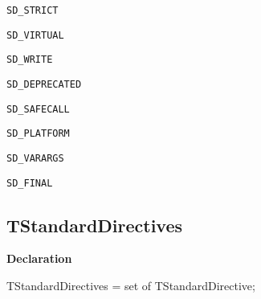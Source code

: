 \documentclass{report}
\newif\ifpdf
\begin{document}
\begin{list}{}
\begin{description}
\item[\texttt{SD{\_}STRICT}] \label{PasDoc_Tokenizer-SD_STRICT}
\index{}
 
\item[\texttt{SD{\_}VIRTUAL}] \label{PasDoc_Tokenizer-SD_VIRTUAL}
\index{}
 
\item[\texttt{SD{\_}WRITE}] \label{PasDoc_Tokenizer-SD_WRITE}
\index{}
 
\item[\texttt{SD{\_}DEPRECATED}] \label{PasDoc_Tokenizer-SD_DEPRECATED}
\index{}
 
\item[\texttt{SD{\_}SAFECALL}] \label{PasDoc_Tokenizer-SD_SAFECALL}
\index{}
 
\item[\texttt{SD{\_}PLATFORM}] \label{PasDoc_Tokenizer-SD_PLATFORM}
\index{}
 
\item[\texttt{SD{\_}VARARGS}] \label{PasDoc_Tokenizer-SD_VARARGS}
\index{}
 
\item[\texttt{SD{\_}FINAL}] \label{PasDoc_Tokenizer-SD_FINAL}
\index{}
 
\end{description}


\end{list}
\ifpdf
\subsection*{\large{\textbf{TStandardDirectives}}\normalsize\hspace{1ex}\hrulefill}
\else
\subsection*{TStandardDirectives}
\fi
\label{PasDoc_Tokenizer-TStandardDirectives}
\begin{list}{}{
\setlength{\itemindent}{0cm}
\setlength{\listparindent}{0cm}
\setlength{\leftmargin}{\evensidemargin}
\addtolength{\leftmargin}{\tmplength}
\settowidth{\labelsep}{X}
\addtolength{\leftmargin}{\labelsep}
\setlength{\labelwidth}{\tmplength}
}
\item[\textbf{Declaration}\hfill]
\ifpdf
\begin{flushleft}
\fi
\begin{ttfamily}
TStandardDirectives = set of TStandardDirective;\end{ttfamily}

\ifpdf
\end{flushleft}
\fi

\end{list}
\ifpdf
\end{document}
